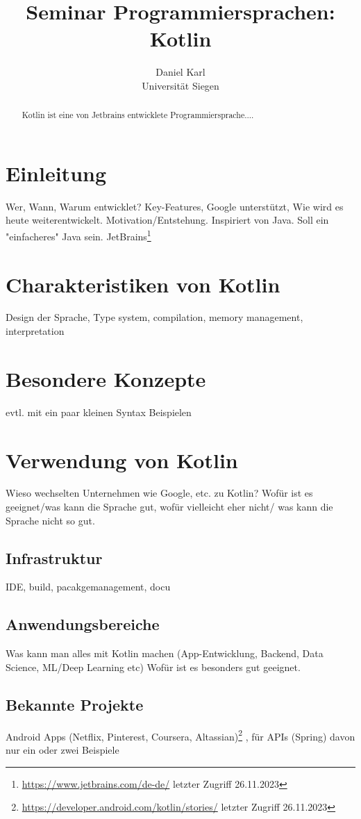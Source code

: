 \documentclass{article}
\title{Seminar Programmiersprachen: Kotlin}
\author{
  Daniel Karl\\
  {\small Universität Siegen}
}
\begin{document}
\maketitle

\begin{abstract}
 Kotlin ist eine von Jetbrains entwicklete Programmiersprache....
\end{abstract}

\section{Einleitung}
Wer, Wann, Warum entwicklet? Key-Features, Google unterstützt, Wie wird es heute weiterentwickelt. Motivation/Entstehung. Inspiriert von Java. Soll ein "einfacheres" Java sein. JetBrains\footnote{\url{https://www.jetbrains.com/de-de/} letzter Zugriff 26.11.2023}  

\section{Charakteristiken von Kotlin}
Design der Sprache, Type system, compilation, memory management, interpretation

\section{Besondere Konzepte}
evtl. mit ein paar kleinen Syntax Beispielen

\section{Verwendung von Kotlin}
Wieso wechselten Unternehmen wie Google, etc. zu Kotlin?
Wofür ist es geeignet/was kann die Sprache gut, wofür vielleicht eher nicht/ was kann die Sprache nicht so gut.

\subsection{Infrastruktur}
IDE, build, pacakgemanagement, docu

\subsection{Anwendungsbereiche}
Was kann man alles mit Kotlin machen (App-Entwicklung, Backend, Data Science, ML/Deep Learning etc) Wofür ist es besonders gut geeignet.
\subsection{Bekannte Projekte}
Android Apps (Netflix, Pinterest, Coursera, Altassian)\footnote{\url{https://developer.android.com/kotlin/stories/} letzter Zugriff 26.11.2023} , für APIs (Spring) davon nur ein oder zwei Beispiele
\end{document}
